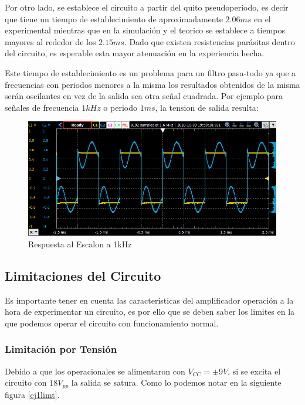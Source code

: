 Por otro lado, se establece el circuito a partir del quito pseudoperiodo, es decir que tiene un tiempo de establecimiento de aproximadamente $2.06ms$ en el experimental mientras que en la simulación y el teorico se establece a tiempos mayores al rededor de los $2.15ms$. Dado que existen resistencias parásitas dentro del circuito, es esperable esta mayor atenuación en la experiencia hecha.

Este tiempo de establecimiento es un problema para un filtro pasa-todo ya que a frecuencias con periodos menores a la misma los resultados obtenidos de la misma serán oscilantes en vez de la salida sea otra señal cuadrada. Por ejemplo para señales de frecuencia $1kHz$ o periodo $1ms$, la tension de salida resulta:

\begin{figure}[H]
    \centering
    \includegraphics[scale = 0.8]{../Ejercicio1-FiltroConGIC/Informe/re1k.png}
    \caption{Respuesta al Escalon a 1kHz}
    \label{ej1re1k}
\end{figure}

\subsection{Limitaciones del Circuito}

Es importante tener en cuenta las características del amplificador operación a la hora de experimentar un circuito, es por ello que se deben saber los limites en la que podemos operar el circuito con funcionamiento normal. 

\subsubsection{Limitación por Tensión}

Debido a que los operacionales se alimentaron con $V_{CC} = \pm 9V$, si se excita el circuito con $18V_{pp}$ la salida se satura. Como lo podemos notar en la siguiente figura \ref{ej1limt}.


